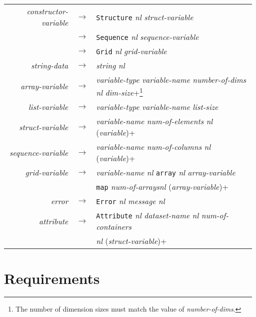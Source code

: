 \documentclass{article}
\begin{document}
\begin{table}
\begin{minipage}{\linewidth}
\begin{center}
\begin{tabular} {|rcl|}
\emph{constructor-variable} 
& $\rightarrow$ & \texttt{Structure} \emph{nl} \emph{struct-variable} \\
& $\rightarrow$ & \texttt{Sequence} \emph{nl} \emph{sequence-variable} \\ 
& $\rightarrow$ & \texttt{Grid} \emph{nl} \emph{grid-variable} \\ \hline

\emph{string-data} 
& $\rightarrow$ & \emph{string} \emph{nl} \\ \hline

\emph{array-variable} 
& $\rightarrow$ & \emph{variable-type} \emph{variable-name}
\emph{number-of-dims} \emph{nl} \emph{dim-size}+\protect\footnote{The number of
  dimension sizes must match the value of \emph{number-of-dims}.} \\ \hline

\emph{list-variable} 
& $\rightarrow$ & \emph{variable-type} \emph{variable-name} \emph{list-size} \\ \hline

\emph{struct-variable} 
& $\rightarrow$ & \emph{variable-name} \emph{num-of-elements} \emph{nl} (\emph{variable})+ \\ \hline

\emph{sequence-variable} 
& $\rightarrow$ & \emph{variable-name} \emph{num-of-columns} \emph{nl} (\emph{variable})+ \\ \hline

\emph{grid-variable}
& $\rightarrow$ & \emph{variable-name} \emph{nl} \texttt{array} \emph{nl} \emph{array-variable} \\
& & \texttt{map} \emph{num-of-arrays}\emph{nl} (\emph{array-variable})+  \\ \hline

\emph{error} 
& $\rightarrow$ & \texttt{Error} \emph{nl} \emph{message} \emph{nl} \\ \hline

\emph{attribute} 
& $\rightarrow$ & \texttt{Attribute} \emph{nl} \emph{dataset-name} \emph{nl}
\emph{num-of-containers} \\ 
& & \emph{nl} (\emph{struct-variable})+ \\ \hline

\end{tabular}
\end{center}
\end{minipage}
\end{table}

\section{Requirements}
\label{sec:requirements}
\end{document}
